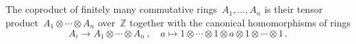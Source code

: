 \subsection{}

The coproduct of finitely many commutative rings~$A_1, \dotsc, A_n$ is their tensor product~$A_1 ⊗ \dotsb ⊗ A_n$ over~$ℤ$ together with the canonical homomorphisms of rings
\[
	A_i \to A_1 ⊗ \dotsb ⊗ A_n \,,
	\quad
	a \mapsto 1 ⊗ \dotsb ⊗ 1 ⊗ a ⊗ 1 ⊗ \dotsb ⊗ 1 \,.
\]
